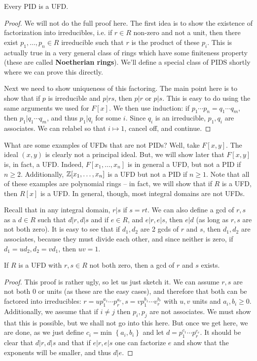 \documentclass{../mathnotes}
\begin{document}
\begin{thm}
    Every PID is a UFD.
\end{thm}
\begin{proof}
    We will not do the full proof here. The first idea is to show the existence of factorization into irreducibles, i.e.
    if $r\in R$ non-zero and not a unit, then there exist $p_1,\ldots, p_n\in R$ irreducible such that $r$ is the product of these $p_i$.
    This is actually true in a very general class of rings which have some finiteness property (these are called \textbf{Noetherian rings}).
    We'll define a special class of PIDS shortly where we can prove this directly.

    Next we need to show uniqueness of this factoring. The main point here is to show that if $p$ is irreducible and $p|rs$, then
    $p|r$ or $p|s$. This is easy to do using the same arguments we used for $F[x]$. We then use induction: if $p_1\cdots p_n=q_1\cdots q_m$,
    then $p_1|q_1\cdots q_m$, and thus $p_1|q_i$ for some $i$. Since $q_i$ is an irreducible, $p_1,q_i$ are associates. We can relabel so that
    $i\mapsto 1$, cancel off, and continue.
\end{proof}

What are some examples of UFDs that are not PIDs? Well, take $F[x,y]$. The ideal $(x,y)$ is clearly not a principal ideal. But,
we will show later that $F[x,y]$ is, in fact, a UFD. Indeed, $F[x_1,\ldots,x_n]$ is in general a UFD, but not a PID if $n\geq 2$.
Additionally, $\mathbb{Z}[x_1,\ldots,x_n]$ is a UFD but not a PID if $n\geq 1$. Note that all of these examples are polynomial rings -- in
fact, we will show that if $R$ is a UFD, then $R[x]$ is a UFD.
In general, though, most integral domains are not UFDs.

Recall that in any integral domain, $r|s$ if $s=rt$. We can also define a gcd of $r,s$ as a $d\in R$ such that $d|r,d|s$ and if $e\in R$,
and $e|r,e|s$, then $e|d$ (as long as $r,s$ are not both zero). It is easy to see that if $d_1,d_2$ are 2 gcds of $r$ and $s$, then $d_1,d_2$
are associates, because they must divide each other, and since neither is zero, if $d_1=ud_2,d_2=vd_1$, then $uv=1$.

\begin{thm}
    If $R$ is a UFD with $r,s\in R$ not both zero, then a gcd of $r$ and $s$ exists.
\end{thm}
\begin{proof}
    This proof is rather ugly, so let us just sketch it. We can assume $r,s$ are not both 0 or units (as these are the easy cases),
    and therefore that both can be factored into irreducibles: $r=up_1^{a_1}\cdots p_r^{a_r},s=vp_1^{b_1}\cdots v_r^{b_r}$ with $u,v$ units and $a_i,b_i\geq 0$.
    Additionally, we assume that if $i\neq j$ then $p_i,p_j$ are not associates. We must show that this is possible, but we shall not go into this here.
    But once we get here, we are done, as we just define $c_i=\text{min }\left\{ a_i,b_i \right\}$ and let $d=p_1^{c_1}\cdots p_r^{c_r}$. It should be
    clear that $d|r, d|s$ and that if $e|r, e|s$ one can factorize $e$ and show that the exponents will be smaller, and thus $d|e$.
\end{proof}
\end{document}
